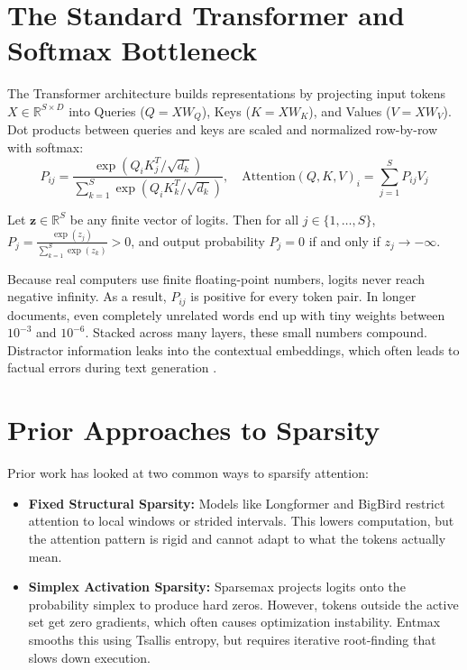 \label{chap:foundations}

\section{The Standard Transformer and Softmax Bottleneck}
The Transformer architecture \cite{vaswani2017attention} builds representations by projecting input tokens $X \in \mathbb{R}^{S \times D}$ into Queries ($Q = X W_Q$), Keys ($K = X W_K$), and Values ($V = X W_V$). Dot products between queries and keys are scaled and normalized row-by-row with softmax:
\begin{equation}
P_{ij} = \frac{\exp(Q_i K_j^T / \sqrt{d_k})}{\sum_{k=1}^S \exp(Q_i K_k^T / \sqrt{d_k})}, \quad \text{Attention}(Q, K, V)_i = \sum_{j=1}^S P_{ij} V_j
\end{equation}

\begin{Proposition}
Let $\mathbf{z} \in \mathbb{R}^{S}$ be any finite vector of logits. Then for all $j \in \{1, \dots, S\}$, $P_j = \frac{\exp(z_j)}{\sum_{k=1}^S \exp(z_k)} > 0$, and output probability $P_j = 0$ if and only if $z_j \to -\infty$.
\end{Proposition}
Because real computers use finite floating-point numbers, logits never reach negative infinity. As a result, $P_{ij}$ is positive for every token pair. In longer documents, even completely unrelated words end up with tiny weights between $10^{-3}$ and $10^{-6}$. Stacked across many layers, these small numbers compound. Distractor information leaks into the contextual embeddings, which often leads to factual errors during text generation \cite{ji2023survey}.

\section{Prior Approaches to Sparsity}
Prior work has looked at two common ways to sparsify attention:
\begin{itemize}[itemsep=1.0pt, topsep=1.5pt, parsep=0pt]
    \item \textbf{Fixed Structural Sparsity:} Models like Longformer \cite{beltagy2020longformer} and BigBird \cite{zaheer2020bigbird} restrict attention to local windows or strided intervals. This lowers computation, but the attention pattern is rigid and cannot adapt to what the tokens actually mean.
    \item \textbf{Simplex Activation Sparsity:} Sparsemax \cite{martins2016sparsemax} projects logits onto the probability simplex to produce hard zeros. However, tokens outside the active set get zero gradients, which often causes optimization instability. Entmax \cite{peters2019sparse} smooths this using Tsallis entropy, but requires iterative root-finding that slows down execution.
\end{itemize}

